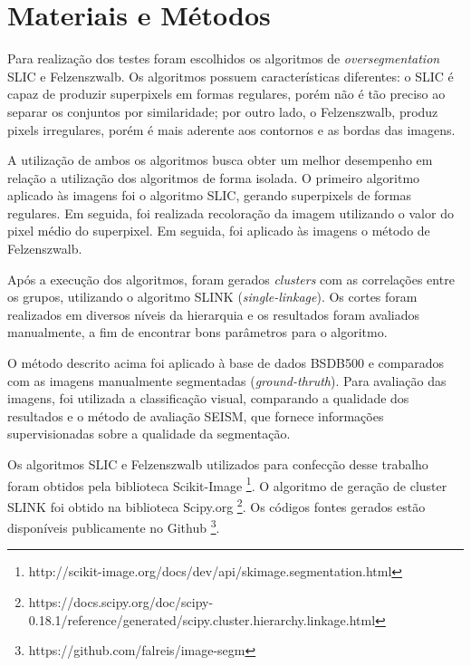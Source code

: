 \begin{document}

\section{Materiais e Métodos} \label{sec:mat_metodos}

Para realização dos testes foram escolhidos os algoritmos de \textit{oversegmentation} SLIC e Felzenszwalb. Os algoritmos possuem características diferentes: o SLIC é capaz de produzir superpixels em formas regulares, porém não é tão preciso ao separar os conjuntos por similaridade; por outro lado, o Felzenszwalb, produz pixels irregulares, porém é mais aderente aos contornos e as bordas das imagens.

A utilização de ambos os algoritmos busca obter um melhor desempenho em relação a utilização  dos algoritmos de forma isolada. O primeiro algoritmo aplicado às imagens foi o algoritmo SLIC, gerando superpixels de formas regulares. Em seguida, foi realizada recoloração da imagem utilizando o valor do pixel médio do superpixel. Em seguida, foi aplicado às imagens o método de Felzenszwalb.

Após a execução dos algoritmos, foram gerados \textit{clusters} com as correlações entre os grupos, utilizando o algoritmo SLINK (\textit{single-linkage}). Os cortes foram realizados em diversos níveis da hierarquia e os resultados foram avaliados manualmente, a fim de encontrar bons parâmetros para o algoritmo. 

O método descrito acima foi aplicado à base de dados BSDB500 e comparados com as imagens manualmente segmentadas (\textit{ground-thruth}). Para avaliação das imagens, foi utilizada a classificação visual, comparando a qualidade dos resultados e o método de avaliação SEISM, que fornece informações supervisionadas sobre a qualidade da segmentação.

Os algoritmos SLIC e Felzenszwalb utilizados para confecção desse trabalho foram obtidos pela biblioteca Scikit-Image \footnote{http://scikit-image.org/docs/dev/api/skimage.segmentation.html}. O algoritmo de geração de cluster SLINK foi obtido na biblioteca Scipy.org \footnote{https://docs.scipy.org/doc/scipy-0.18.1/reference/generated/scipy.cluster.hierarchy.linkage.html}. Os códigos fontes gerados estão disponíveis publicamente no Github \footnote{https://github.com/falreis/image-segm}.
\end{document}
